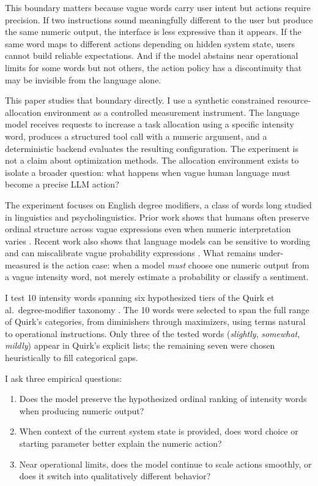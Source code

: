 \documentclass[11pt]{article}
\begin{document}
This boundary matters because vague words carry user intent but actions require precision. If two instructions sound meaningfully different to the user but produce the same numeric output, the interface is less expressive than it appears. If the same word maps to different actions depending on hidden system state, users cannot build reliable expectations. And if the model abstains near operational limits for some words but not others, the action policy has a discontinuity that may be invisible from the language alone.

This paper studies that boundary directly. I use a synthetic constrained resource-allocation environment as a controlled measurement instrument. The language model receives requests to increase a task allocation using a specific intensity word, produces a structured tool call with a numeric argument, and a deterministic backend evaluates the resulting configuration. The experiment is not a claim about optimization methods. The allocation environment exists to isolate a broader question: what happens when vague human language must become a precise LLM action?

The experiment focuses on English degree modifiers, a class of words long studied in linguistics and psycholinguistics. Prior work shows that humans often preserve ordinal structure across vague expressions even when numeric interpretation varies \citep{cliff1959, mosteller1990, ramotowska2024}. Recent work also shows that language models can be sensitive to wording and can miscalibrate vague probability expressions \citep{zhang2024, brittlebench2026}. What remains under-measured is the action case: when a model \textit{must} choose one numeric output from a vague intensity word, not merely estimate a probability or classify a sentiment.

I test 10 intensity words spanning six hypothesized tiers of the Quirk et al.\ degree-modifier taxonomy \citep{quirk1985}. The 10 words were selected to span the full range of Quirk's categories, from diminishers through maximizers, using terms natural to operational instructions. Only three of the tested words (\textit{slightly}, \textit{somewhat}, \textit{mildly}) appear in Quirk's explicit lists; the remaining seven were chosen heuristically to fill categorical gaps.

I ask three empirical questions:
\begin{enumerate}
    \item Does the model preserve the hypothesized ordinal ranking of intensity words when producing numeric output?
    \item When context of the current system state is provided, does word choice or starting parameter better explain the numeric action?
    \item Near operational limits, does the model continue to scale actions smoothly, or does it switch into qualitatively different behavior?
\end{enumerate}
\end{document}
